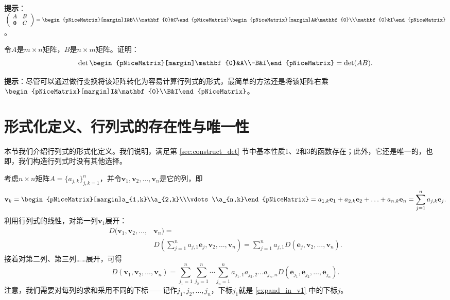 \begin{problemset}
  {\bf 提示}：$\left.\left(\begin{array}{cc}A&B\\\mathbf{0}&C\end{array}\right.\right)=\begin{pNiceMatrix}[margin]I&B\\\mathbf{0}&C\end{pNiceMatrix}\begin{pNiceMatrix}[margin]A&\mathbf{0}\\\mathbf{0}&I\end{pNiceMatrix}$。
  \item 令$A$是$m\times n$矩阵，$B$是$n\times m$矩阵。证明：\[\det\begin{pNiceMatrix}[margin]\mathbf{0}&A\\-B&I\end{pNiceMatrix}=\det(AB).\]
  
  {\bf 提示}：尽管可以通过做行变换将该矩阵转化为容易计算行列式的形式，最简单的方法还是将该矩阵右乘$\begin{pNiceMatrix}[margin]I&\mathbf{0}\\B&I\end{pNiceMatrix}$。
\end{problemset}

\section{形式化定义、行列式的存在性与唯一性}\label{sec:determinant_formal}

本节我们介绍行列式的形式化定义。我们说明，满足第 \ref{sec:construct_det} 节中基本性质1、2和3的函数存在；此外，它还是唯一的，也即，我们构造行列式时没有其他选择。

考虑$n\times n$矩阵$A=\{a_{j,k}\}_{j,k=1}^{n}$，并令$\mathbf{v}_1,\mathbf{v}_2,\ldots,\mathbf{v}_n$是它的列，即\[\mathbf{v}_k=\begin{pNiceMatrix}[margin]a_{1,k}\\a_{2,k}\\\vdots\\a_{n,k}\end{pNiceMatrix}=a_{1,k}\mathbf{e}_1+a_{2,k}\mathbf{e}_2+\ldots+a_{n,k}\mathbf{e}_n=\sum_{j=1}^na_{j,k}\mathbf{e}_j.\]
利用行列式的线性，对第一列$\mathbf{v}_1$展开：
\begin{align}
  D(\mathbf{v}_{1},\mathbf{v}_{2},\ldots,&\mathbf{v}_{n})= \label{expand_in_v1}\\
  &D(\sum_{j=1}^{n}a_{j,1}\mathbf{e}_{j},\mathbf{v}_{2},\ldots,\mathbf{v}_{n})=\sum_{j=1}^{n}a_{j,1}D(\mathbf{e}_{j},\mathbf{v}_{2},\ldots,\mathbf{v}_{n}).\nonumber
\end{align}
接着对第二列、第三列……展开，可得\[D(\mathbf{v}_1,\mathbf{v}_2,\ldots,\mathbf{v}_n)=\sum_{j_1=1}^n\sum_{j_2=1}^n\cdots\sum_{j_n=1}^na_{j_1,1}a_{j_2,2}\ldots a_{j_n,n}D(\mathbf{e}_{j_1},\mathbf{e}_{j_2},\ldots,\mathbf{e}_{j_n}).\]
注意，我们需要对每列的求和采用不同的下标——记作$j_1,j_2,\dots,j_n$，下标$j_1$就是 \eqref{expand_in_v1} 中的下标$j$。

